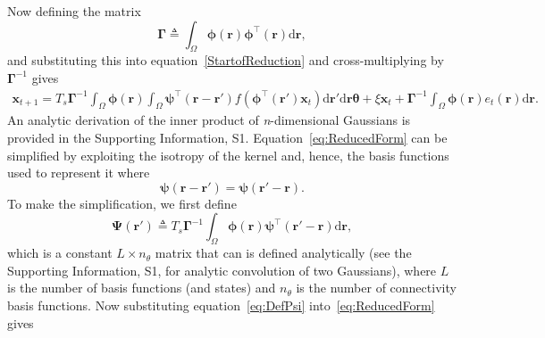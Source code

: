 \documentclass[10pt]{article}
\begin{document}
Now defining the matrix
\begin{equation}\label{eq:DefGamma}
	\boldsymbol{\Gamma} \triangleq \int_\Omega {\boldsymbol{\phi} \left(\mathbf{r}\right)\boldsymbol{\phi} ^{\top}\left(\mathbf{r}\right)\textrm{d}\mathbf{r}}, 
\end{equation}
and substituting this into equation~\ref{StartofReduction} and cross-multiplying by $\boldsymbol{\Gamma}^{-1}$ gives 
\begin{equation}
    \label{eq:ReducedForm}
    \begin{split}
	 \mathbf{x}_{t+1} = T_s\boldsymbol{\Gamma}^{-1}
	 \int_\Omega \boldsymbol{\phi}(\mathbf{r}) 
	 \int_\Omega \boldsymbol{\psi}^{\top} (\mathbf{r}-\mathbf{r}')f(\boldsymbol{\phi}^{\top}(\mathbf{r}')\mathbf{x}_t) \textrm{d}\mathbf{r}' \textrm{d}\mathbf{r} \boldsymbol{\theta}  
	 + \xi\mathbf{x}_t + \boldsymbol{\Gamma}^{-1} \int_\Omega{\boldsymbol{\phi}(\mathbf{r}) e_t(\mathbf{r})\textrm{d}\mathbf{r}}.
	 \end{split}
\end{equation}
An analytic derivation of the inner product of \emph{n}-dimensional Gaussians is provided in the Supporting Information, S1. Equation~\ref{eq:ReducedForm} can be simplified by exploiting the isotropy of the kernel and, hence, the basis functions used to represent it where
\begin{equation}
	\boldsymbol{\psi} (\mathbf{r}-\mathbf{r}') = \boldsymbol{\psi} (\mathbf{r}'-\mathbf{r}).
\end{equation}
To make the simplification, we first define
\begin{equation}\label{eq:DefPsi}
	\boldsymbol{\Psi}(\mathbf{r}') \triangleq T_s\boldsymbol{\Gamma}^{-1}\int_\Omega {\boldsymbol{\phi}(\mathbf{r})\boldsymbol{\psi}^{\top} (\mathbf{r}'-\mathbf{r})\textrm{d}\mathbf{r}},
\end{equation}
which is a constant $L \times n_{\theta}$ matrix that can is defined analytically (see the Supporting Information, S1, for analytic convolution of two Gaussians), where $L$ is the number of basis functions (and states) and $n_{\theta}$ is the number of connectivity basis functions. Now substituting equation~\ref{eq:DefPsi} into~\ref{eq:ReducedForm} gives
\end{document}
